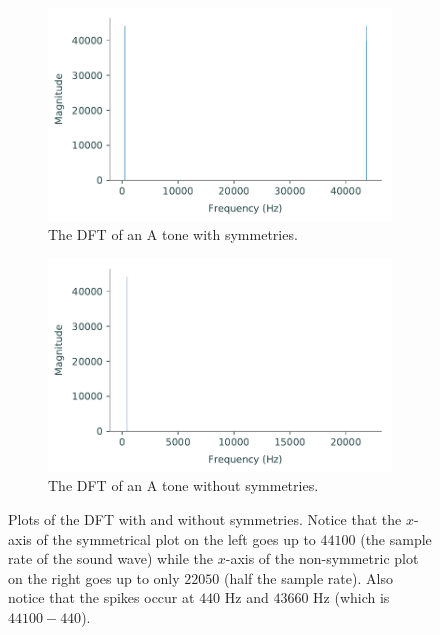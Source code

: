 \begin{figure}[H]
\captionsetup[subfigure]{justification=centering}
\centering
\begin{subfigure}{.49\textwidth}
    \centering
    \includegraphics[width=\linewidth]{figures/dft_a.pdf}
    \caption{The DFT of an A tone with symmetries.}
    \label{fig:dft_a}
\end{subfigure}
\begin{subfigure}{.49\textwidth}
    \centering
    \includegraphics[width=\linewidth]{figures/dft_a_half.pdf}
    \caption{The DFT of an A tone without symmetries.}
    \label{fig:dft_a_half}
\end{subfigure}
\caption{Plots of the DFT with and without symmetries.
Notice that the $x$-axis of the symmetrical plot on the left goes up to $44100$ (the sample rate of the sound wave) while the $x$-axis of the non-symmetric plot on the right goes up to only $22050$ (half the sample rate).
Also notice that the spikes occur at $440$ Hz and $43660$ Hz (which is $44100 - 440$).}
\end{figure}

